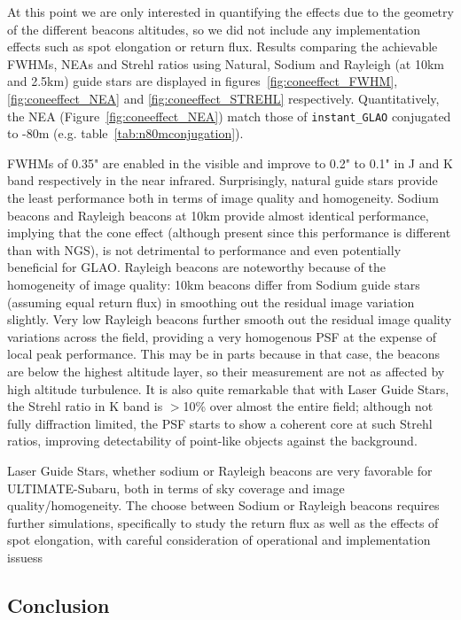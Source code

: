 \documentclass[aas_macros,10pt]{article}
\begin{document}
At this point we are only interested in quantifying the effects due to the geometry of the different beacons altitudes, so we did not include any implementation effects such as spot elongation or return flux. Results comparing the achievable FWHMs, NEAs and Strehl ratios using Natural, Sodium and Rayleigh (at 10km and 2.5km) guide stars are displayed in figures~\ref{fig:coneeffect_FWHM}, \ref{fig:coneeffect_NEA} and \ref{fig:coneeffect_STREHL} respectively. Quantitatively, the NEA (Figure~\ref{fig:coneeffect_NEA}) match those of \texttt{instant\_GLAO} conjugated to -80m (e.g. table~\ref{tab:n80mconjugation}).  

FWHMs of 0.35" are enabled in the visible and improve to 0.2" to 0.1" in J and K band respectively in the near infrared. Surprisingly, natural guide stars provide the least performance both in terms of image quality and homogeneity. Sodium beacons and Rayleigh beacons at 10km provide almost identical performance, implying that the cone effect (although present since this performance is different than with NGS), is not detrimental to performance and even potentially beneficial for GLAO. Rayleigh beacons are noteworthy because of the homogeneity of image quality: 10km beacons differ from Sodium guide stars (assuming equal return flux) in smoothing out the residual image variation slightly. Very low Rayleigh beacons further smooth out the residual image quality variations across the field, providing a very homogenous PSF at the expense of local peak performance. This may be in parts because in that case, the beacons are below the highest altitude layer, so their measurement are not as affected by high altitude turbulence. It is also quite remarkable that with Laser Guide Stars, the Strehl ratio in K band is $>$10\% over almost the entire field; although not fully diffraction limited, the PSF starts to show a coherent core at such Strehl ratios, improving detectability of point-like objects against the background. 

Laser Guide Stars, whether sodium or Rayleigh beacons are very favorable for ULTIMATE-Subaru, both in terms of sky coverage and image quality/homogeneity. The choose between Sodium or Rayleigh beacons requires further simulations, specifically to study the return flux as well as the effects of spot elongation, with careful consideration of operational and implementation issuess

\subsection{Conclusion}
\end{document}
